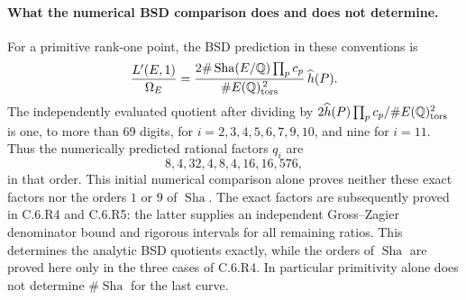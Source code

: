 \paragraph{What the numerical BSD comparison does and does not determine.}
For a primitive rank-one point, the BSD prediction in these conventions is
\[
 \frac{L'(E,1)}{\Omega_E}
 =\frac{2\#\operatorname{Sha}(E/\mathbb Q)\prod_pc_p}
        {\#E(\mathbb Q)_{\rm tors}^{\,2}}\,\widehat h(P).
\]
The independently evaluated quotient after dividing by
$2\widehat h(P)\prod_pc_p/\#E(\mathbb Q)_{\rm tors}^2$ is one, to
more than 69 digits, for $i=2,3,4,5,6,7,9,10$, and nine for
$i=11$. Thus the numerically predicted rational factors $q_i$ are
\[
 8,4,32,4,8,4,16,16,576,
\]
in that order. This initial numerical comparison alone proves neither
these exact factors nor the orders $1$ or $9$ of $\operatorname{Sha}$.
The exact factors are subsequently proved in C.6.R4 and C.6.R5:
the latter supplies an independent Gross--Zagier denominator bound
and rigorous intervals for all remaining ratios. This determines
the analytic BSD quotients exactly, while the orders of
$\operatorname{Sha}$ are proved here only in the three cases of
C.6.R4. In particular primitivity alone does not determine
$\#\operatorname{Sha}$ for the last curve.

